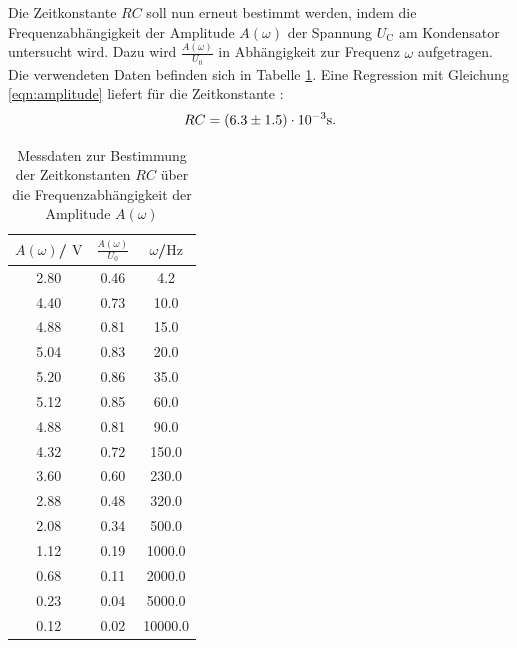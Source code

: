 Die Zeitkonstante $RC$ soll nun erneut bestimmt werden, indem die Frequenzabhängigkeit der Amplitude $A(\omega)$ der Spannung $U_\text{C}$ am Kondensator untersucht wird.
Dazu wird $\frac{A(\omega)}{U_\text{0}}$ in Abhängigkeit zur Frequenz $\omega$ aufgetragen. Die verwendeten Daten befinden sich in Tabelle \ref{tab:tab2}.
Eine Regression mit Gleichung \eqref{eqn:amplitude} liefert für die Zeitkonstante :
\begin{equation*}
	\centering
	RC=(6.3 \pm 1.5)\cdot 10^{-3} \si{\second} .
\end{equation*}
\begin{table}
	\caption{Messdaten zur Bestimmung der Zeitkonstanten $RC$ über die Frequenzabhängigkeit der Amplitude $A(\omega)$}
	\label{tab:tab2}
	\centering
	\begin{tabular} {ccc}
		\toprule
		$A(\omega)$/ $\si{\volt}$ & $\frac{A(\omega)}{U_\text{0}}$ & $\omega$/$\si{\Hz}$ \\
		\midrule
		2.80                      & 0.46                           & 4.2                 \\
		4.40                      & 0.73                           & 10.0                \\
		4.88                      & 0.81                           & 15.0                \\
		5.04                      & 0.83                           & 20.0                \\
		5.20                      & 0.86                           & 35.0                \\
		5.12                      & 0.85                           & 60.0                \\
		4.88                      & 0.81                           & 90.0                \\
		4.32                      & 0.72                           & 150.0               \\
		3.60                      & 0.60                           & 230.0               \\
		2.88                      & 0.48                           & 320.0               \\
		2.08                      & 0.34                           & 500.0               \\
		1.12                      & 0.19                           & 1000.0              \\
		0.68                      & 0.11                           & 2000.0              \\
		0.23                      & 0.04                           & 5000.0              \\
		0.12                      & 0.02                           & 10000.0             \\
		\bottomrule
	\end{tabular}
\end{table}

